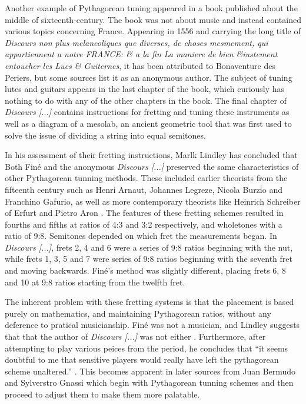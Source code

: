 Another example of Pythagorean tuning appeared in a book published about the
middle of sixteenth-century.  The book was not about music and instead
contained various topics concerning France.  Appearing in 1556 and carrying
the long title of \textit{Discours
non plus melancoliques que diverses, de choses mesmement, qui appartiennent
a notre FRANCE: \& a la fin La maniere de bien \&iustement entoucher
les Lucs \& Guiternes}, it has been attributed to Bonaventure des Periers,
but some sources list it as an anonymous author.  The subject of tuning lutes
and guitars appears in the last chapter of the book, which curiously has nothing
to do with any of the other chapters in the book. The final chapter of \textit{Discours [...]}
contains instructions for fretting
and tuning these instruments as well as a diagram of a mesolab, an ancient geometric tool that
was first used to solve the issue of dividing a string into equal semitones.

In his assessment of their fretting instructions, Marlk Lindley has concluded that
Both Fin\'{e} and the anonymous \textit{Discours [...]}  preserved the same characteristics
of other Pythagorean tunning methods.  These included earlier theorists from the fifteenth
century such as Henri Arnaut, Johannes Legreze, Nicola Burzio and Franchino Gafurio, as well
as more contemporary theorists like Heinrich Schreiber of Erfurt and Pietro Aron \autocite[11]{ML:1}.
The features of these fretting schemes resulted in fourths and fifths at ratios of 4:3 and 3:2
respectively, and wholetones with a ratio of 9:8.  Semitones depended on which fret the measurements
began.  In \textit{Discours [...]}, frets 2, 4 and 6 were a series of 9:8 ratios beginning with
the nut, while frets 1, 3, 5 and 7 were series of 9:8 ratios beginning with the seventh fret and
moving backwards.  Fin\'{e}'s method was slightly different, placing frets 6, 8 and 10 at 9:8
ratios starting from the twelfth fret.

The inherent problem with these fretting systems is that the placement is based purely on
mathematics, and maintaining Pythagorean ratios, without any deference to pratical musicianship.
Fin\'{e} was not a musician, and Lindley suggests that that the author of \textit{Discours [...]}
was not either \autocite[11]{ML:1}.  Furthermore, after attempting to play various peices from
the period, he concludes that ``it seems doubtful to me that sensitive players would really
have left the pythagorean scheme unaltered.'' \autocite[13]{ML:1}.  This becomes apparent
in later sources from Juan Bermudo and Sylverstro Gnassi which begin with Pythagorean tunning schemes
and then proceed to adjust them to make them more palatable.

